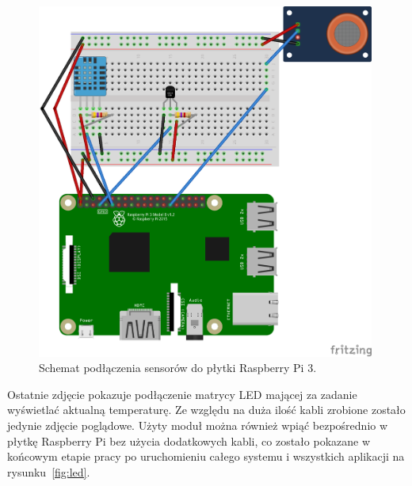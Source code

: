 \documentclass[12pt]{report}
\begin{document}
{\begin{figure}[h]
	\centering
	\includegraphics[width=0.99\textwidth]{images/rpi-master.png}
	\caption{Schemat podłączenia sensorów do płytki Raspberry Pi 3.}
\end{figure}
\FloatBarrier	

Ostatnie zdjęcie pokazuje podłączenie matrycy LED mającej za zadanie wyświetlać aktualną temperaturę. Ze względu na duża ilość kabli zrobione zostało jedynie zdjęcie poglądowe. Użyty moduł można również wpiąć bezpośrednio w płytkę Raspberry Pi bez użycia dodatkowych kabli, co zostało pokazane w końcowym etapie pracy po uruchomieniu całego systemu i wszystkich aplikacji na rysunku~\ref{fig:led}. 

}
\end{document}
